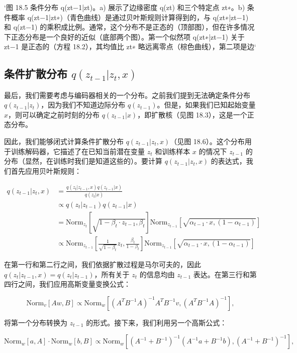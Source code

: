 `图 18.5 条件分布 q(zt−1|zt)。a) 展示了边缘密度 q(zt) 和三个特定点 zt∗。b) 条件概率 q(zt−1|zt∗)（青色曲线）是通过贝叶斯规则计算得到的，与 q(zt∗|zt−1) 和 q(zt−1) 的乘积成比例。通常，这个分布不是正态的（顶部图），但在许多情况下正态分布是一个良好的近似（底部两个图）。第一个似然项 q(zt∗|zt−1) 关于 zt−1 是正态的（方程 18.2），其均值比 zt∗ 略远离零点（棕色曲线），第二项是边`


\subsection{条件扩散分布 \(q(z_{t-1}|z_t, x)\)}
最后，我们需要考虑与编码器相关的一个分布。之前我们提到无法确定条件分布 \(q(z_{t-1}|z_t)\)，因为我们不知道边际分布 \(q(z_{t-1})\)。但是，如果我们已知起始变量 \(x\)，则可以确定之前时刻的分布 \(q(z_{t-1}|x)\)，即扩散核（见图 18.3），这是一个正态分布。

因此，我们能够闭式计算条件扩散分布 \(q(z_{t-1}|z_t, x)\)（见图 18.6）。这个分布用于训练解码器，它描述了在已知当前潜在变量 \(z_t\) 和训练样本 \(x\) 的情况下 \(z_{t-1}\) 的分布（显然，在训练时我们是知道这些的）。要计算 \(q(z_{t-1}|z_t, x)\) 的表达式，我们首先应用贝叶斯规则：



\begin{align}
q(z_{t-1}|z_t, x) &= \frac{q(z_t|z_{t-1}, x)q(z_{t-1}|x)}{q(z_t|x)} \\
&\propto q(z_t|z_{t-1})q(z_{t-1}|x) \\
&= \text{Norm}_{z_t} \left[ \sqrt{1 - \beta_t \cdot z_{t-1}, \beta_t} \right] \text{Norm}_{z_{t-1}} \left[ \sqrt{\alpha_{t-1} \cdot x, (1 - \alpha_{t-1})} \right] \\
&\propto \text{Norm}_{z_{t-1}} \left[ \frac{1}{\sqrt{1 - \beta_t}} z_t, \frac{\beta_t}{1 - \beta_t} \right] \text{Norm}_{z_{t-1}} \left[ \sqrt{\alpha_{t-1} \cdot x, (1 - \alpha_{t-1})} \right]
\end{align} 


在第一行和第二行之间，我们依据扩散过程是马尔可夫的，因此 \(q(z_t|z_{t-1}, x) = q(z_t|z_{t-1})\)，所有关于 \(z_t\) 的信息均由 \(z_{t-1}\) 表达。在第三行和第四行之间，我们应用高斯变量变换公式：

\[
\text{Norm}_{v} [Aw, B] \propto \text{Norm}_{w} \left[ (A^T B^{-1} A)^{-1} A^T B^{-1} v, (A^T B^{-1} A)^{-1} \right], \tag{18.13}
\]

将第一个分布转换为 \(z_{t-1}\) 的形式。接下来，我们利用另一个高斯公式：

\[
\text{Norm}_{w}[a, A] \cdot \text{Norm}_{w}[b, B] \propto \text{Norm}_{w} \left[ (A^{-1} + B^{-1})^{-1} (A^{-1} a + B^{-1} b), (A^{-1} + B^{-1})^{-1} \right], \tag{18.14}
\]

